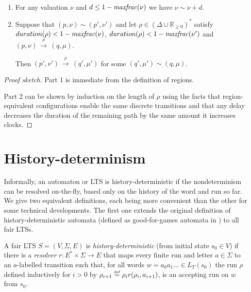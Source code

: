 \documentclass[10pt,a4paper]{amsart}
\theoremstyle{definition}
\numberwithin{equation}{section}
\newcommand{\nnreals}{{\mathbb R}_{\geq 0}}
\newcommand{\x}{\times}
\newcommand{\eqby}[2][=]{\stackrel{\text{{\tiny{#2}}}}{#1}}
\newcommand{\eqdef}{\eqby{def}}
\newcommand{\maxfractof}[1]{{\it maxfrac}(#1)}
\newcommand{\transitions}{\Delta}
\newcommand{\lang}{L_T}  %
\newcommand{\dur}[1]{\mathop{duration}(#1)}
\newcommand{\step}[2][]{\Step{#2}{}{#1}}
\newcommand{\Step}[3]{\ensuremath{\,{\stackrel{#1}{\longrightarrow}}{}^{\scriptstyle{#2}}_{\scriptstyle{#3}}}\,}
\newcommand{\lts}{S}
\newcommand{\ltsStates}{V}
\newcommand{\ltsAlphabet}{\Sigma}
\newcommand{\ltsTransitions}{E}
\newcommand{\ltsDef}{\lts = (\ltsStates, \ltsAlphabet, \ltsTransitions)}
\newcommand{\req}{\sim}
\begin{document}
\begin{proposition}\
    \label{lem:paths}
\begin{enumerate}
    \item 
    \label{lem:paths-short-delay}
For any valuation $\nu$ and $d\le 1- \maxfractof{\nu}$
we have $\nu\req\nu+d$.


    \item 
    \label{lem:paths-short-path}
    Suppose that
    $(p,\nu)\req(p',\nu')$
    and let
    $\rho\in (\transitions\cup\nnreals)^*$
    satisfy
    $\dur{\rho} < 1-\maxfractof{\nu}$,
    $\dur{\rho} < 1-\maxfractof{\nu'}$
    and
    $(p,\nu)\step{\rho}(q,\mu)$.
    
    Then 
    $(p',\nu')\step{\rho}(q',\mu')$
    for some 
    $(q',\mu')\req(q,\mu)$.
\end{enumerate}
\end{proposition}
\begin{proof}[Proof sketch]
    Part 1 is immediate from the definition of regions.


    Part 2 can be shown by induction on the length of $\rho$
    using the facts that region-equivalent configurations enable the same discrete transitions
    and that
    any delay decreases the duration of the remaining path by the same amount it increases clocks.
    \qedhere


\end{proof}
	
	\section{History-determinism}
	\label{sec:gfg}
Informally, an  automaton or LTS is history-deterministic if the nondeterminism can be resolved on-the-fly, based only on the history of the word and run so far. We give two equivalent definitions, each being more convenient than the other for some technical developments. 
The first one extends the original definition of history-deterministic  automata (defined as good-for-games automata in \cite{HP06}) to all fair LTSs. 

\begin{definition}
    A fair LTS $\ltsDef$ is \emph{history-deterministic} (from initial state $s_0\in V$) if there is a \emph{resolver} $r:E^*\x\Sigma\to E$ that maps every finite run and letter $a\in \Sigma$ to an $a$-labelled transition
    such that, for all words $w=a_0a_1\dots \in \lang(s_0)$
    the run $\rho$ defined inductively for $i>0$ by $\rho_{i+1} \eqdef \rho_ir(\rho_i, a_{i+1})$,
    is an accepting run on $w$ from $s_0$.
\end{definition}
\end{document}
